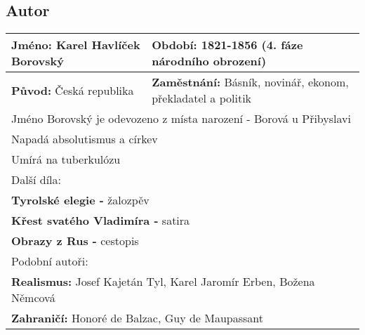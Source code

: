 \subsection*{Autor}
\begin{tabularx}{\linewidth}{l|l}
  \textbf{Jméno:} Karel Havlíček Borovský & \textbf{Období:} 1821-1856 (4. fáze národního obrození)             \\
  \hline
  \textbf{Původ:} Česká republika         & \textbf{Zaměstnání:} Básník, novinář, ekonom, překladatel a politik \\
  \hline
  \multicolumn{2}{l}{Jméno Borovský je odevozeno z místa narození - Borová u Přibyslavi}                        \\
  \multicolumn{2}{l}{Napadá absolutismus a církev}                                                              \\
  \multicolumn{2}{l}{Umírá na tuberkulózu}                                                                      \\
  \hline
  \multicolumn{2}{l}{Další díla:}                                                                               \\
  \multicolumn{2}{l}{\textbf{Tyrolské elegie -} žalozpěv}                                                       \\
  \multicolumn{2}{l}{\textbf{Křest svatého Vladimíra -} satira}                                                 \\
  \multicolumn{2}{l}{\textbf{Obrazy z Rus -} cestopis}                                                          \\
  \hline
  \multicolumn{2}{l}{Podobní autoři:}                                                                           \\
  \multicolumn{2}{l}{\textbf{Realismus:} Josef Kajetán Tyl, Karel Jaromír Erben, Božena Němcová}                \\
  \multicolumn{2}{l}{\textbf{Zahraničí:} Honoré de Balzac, Guy de Maupassant}                                   \\
\end{tabularx}
